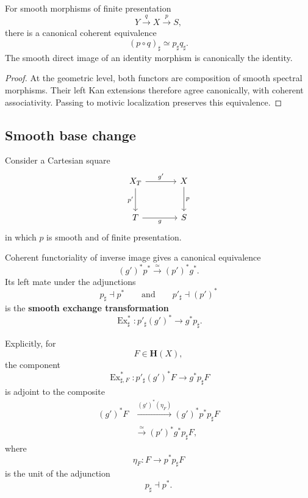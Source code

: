 \begin{proposition}
\label{prop:smooth-direct-image-composition}
For smooth morphisms of finite presentation
\[
    Y
    \xrightarrow{q}
    X
    \xrightarrow{p}
    S,
\]
there is a canonical coherent equivalence
\[
    (p\circ q)_\sharp
    \simeq
    p_\sharp q_\sharp.
\]
The smooth direct image of an identity morphism is canonically the
identity.
\end{proposition}

\begin{proof}
At the geometric level, both functors are composition of smooth
spectral morphisms.  Their left Kan extensions therefore agree
canonically, with coherent associativity.  Passing to motivic
localization preserves this equivalence.
\end{proof}

\subsection{Smooth base change}

\begin{construction}
\label{con:unstable-smooth-exchange-transformation}
Consider a Cartesian square
\[
\begin{tikzcd}[column sep=large, row sep=large]
    X_T
        \arrow[r, "g'"]
        \arrow[d, "p'"']
    &
    X
        \arrow[d, "p"]
    \\
    T
        \arrow[r, "g"']
    &
    S
\end{tikzcd}
\]
in which \(p\) is smooth and of finite presentation.

Coherent functoriality of inverse image gives a canonical equivalence
\[
    (g')^*p^*
    \xrightarrow{\simeq}
    (p')^*g^*.
\]
Its left mate under the adjunctions
\[
    p_\sharp
    \dashv
    p^*
    \qquad\text{and}\qquad
    p'_\sharp
    \dashv
    (p')^*
\]
is the \textbf{smooth exchange transformation}
\[
    \operatorname{Ex}_{\sharp}^{*}
    \colon
    p'_\sharp(g')^*
    \longrightarrow
    g^*p_\sharp.
\]

Explicitly, for
\[
    F
    \in
    \mathbf H(X),
\]
the component
\[
    \operatorname{Ex}_{\sharp,F}^{*}
    \colon
    p'_\sharp(g')^*F
    \longrightarrow
    g^*p_\sharp F
\]
is adjoint to the composite
\[
\begin{aligned}
    (g')^*F
    &\xrightarrow{(g')^*(\eta_F)}
    (g')^*p^*p_\sharp F
    \\
    &\xrightarrow{\simeq}
    (p')^*g^*p_\sharp F,
\end{aligned}
\]
where
\[
    \eta_F
    \colon
    F
    \longrightarrow
    p^*p_\sharp F
\]
is the unit of the adjunction
\[
    p_\sharp
    \dashv
    p^*.
\]
\end{construction}

